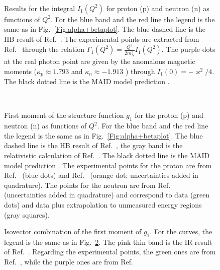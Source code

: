\documentclass[twocolumn,prc,showpacs,nofootinbib,preprintnumbers,amsmath,amssymb,superscriptaddress]{revtex4-1}
\begin{document}
\begin{figure}[H]
\begin{center}
\hspace{-0.3cm} \\[0.5cm]
\hspace{-0.3cm} 
\caption{Results for the integral $I_1 (Q^2)$ for proton (p) and neutron (n) as functions of $Q^2$. For the blue band and the red line the legend is the same as in Fig.~\ref{Fig:alpha+betaplot}. The blue dashed line is the HB result of Ref.~\cite{Kao:2003jd}. The experimental points are extracted from Ref.~\cite{Prok:2008ev} through the relation $\Gamma_1(Q^2) = \frac{Q^2}{2m_N^2}I_1(Q^2)$. The purple dots at the real photon point are given by the anomalous magnetic moments ($\kappa_p \approx 1.793$ and $\kappa_n\approx -1.913$ \cite{Mohr:2012tt}) through $I_1(0)=-\varkappa^2/4$. The black dotted line is the MAID model prediction \cite{MAID}.\label{Fig:I1plot}}
\end{center}
\end{figure}

\begin{figure}[H]
\begin{center}
\hspace{-0.3cm} \\[0.5cm]\hspace{-0.3cm} 
\caption{First moment of the structure function $g_1$ for the proton (p) and neutron (n) as functions of $Q^2$. For the blue band and the red line the legend is the same as in Fig.~\ref{Fig:alpha+betaplot}. The blue dashed line is the HB result of Ref.~\cite{Kao:2003jd}, the gray band is the relativistic calculation of Ref.~\cite{Bernard:2012hb}. The black dotted line is the MAID model prediction \cite{MAID}. The experimental points for the proton are from Ref.~\cite{Prok:2008ev} (blue dots) and Ref.~\cite{Zielinski:2017gwp} (orange dot; uncertainties added in quadrature). The points for the neutron are from Ref.~\cite{Guler:2015} (uncertainties added in quadrature) and correspond to data (green dots) and data plus extrapolation to unmeasured energy regions (gray squares).\label{Fig:Gamma1plot}} 
\end{center}
\end{figure}

\begin{figure}[H]
\begin{center}
\hspace{-0.3cm} 
\caption{Isovector combination of the first moment of $g_1$. For the curves, the legend is the same as in Fig.~\ref{Fig:Gamma1plot}. 
The pink thin band is the IR result of Ref.~\cite{Bernard:2002pw}. 
Regarding the experimental points, the green ones are from Ref.~\cite{Deur:2008ej}, while the purple ones are from Ref.~\cite{Deur:2004ti} \label{Fig:Gamma1-isovector-plot}}

\end{center}
\end{figure}
\end{document}

